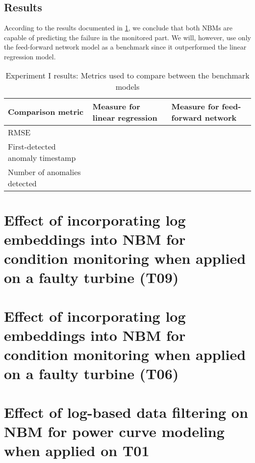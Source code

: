 \subsection{Results}
According to the results documented in \ref{tab:Experiment I results}, we conclude that both NBMs are capable of predicting the failure in the monitored part. We will, however, use only the feed-forward network model as a benchmark since it outperformed the linear regression model.
\begin{table}[H]
        \centering
    \begin{tabular}{|m{4cm}|m{4cm}|m{4cm}|}
    \hline
         \textbf{Comparison metric} & \textbf{Measure for linear regression}   & \textbf{Measure for feed-forward network}\\
         \hline
         RMSE & & \\
         \hline
         First-detected anomaly timestamp & & \\
         \hline
         Number of anomalies detected & & \\
         \hline
    \hline
    \end{tabular}
    \caption{Experiment I results: Metrics used to compare between the benchmark models}
        \label{tab:Experiment I results}
\end{table}

\section{Effect of incorporating log embeddings into NBM for condition monitoring when applied on a faulty turbine (T09)}

\section{Effect of incorporating log embeddings into NBM for condition monitoring when applied on a faulty turbine (T06)}

\section{Effect of log-based data filtering on NBM for power curve modeling when applied on T01}